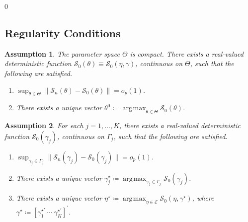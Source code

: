\documentclass[12pt]{article}
\newcommand{\blind}{0}
\newtheorem{assumption}{Assumption}
\theoremstyle{definition}
\theoremstyle{remark}
\DeclareMathOperator*{\argmax}{\arg\!\max}
\begin{document}
\blind
{
\newpage
} \fi

\setcounter{equation}{0}
\renewcommand{\theequation}{\thesection.\arabic{equation}}


\subsection{Regularity Conditions\label{subsec:regularity}}

\begin{assumption}
\label{ast:exp}
The parameter space $\Theta$ is compact. There exists a real-valued deterministic function $\mathcal{S}_0(\theta) \equiv \mathcal{S}_{0}(\eta, \gamma)$, continuous on $\Theta$, such that the following are satisfied.

\begin{enumerate}
\item $\sup_{\theta\in\Theta} \| \mathcal{S}_{n}(\theta) - \mathcal{S}_0(\theta) \| = o_p(1)$.
\item There exists a unique vector $\theta^0 \coloneqq \argmax_{\theta \in \Theta} \mathcal{S}_0(\theta)$.
\end{enumerate}
\end{assumption}

\begin{assumption}
\label{ast:exp2}
For each $j=1, \ldots, K$, there exists a real-valued deterministic function $\mathcal{S}_0(\gamma_j)$, continuous on $\Gamma_j$,
such that the following are satisfied.

\begin{enumerate}
\item $\sup_{\gamma_j\in\Gamma_j} \| \mathcal{S}_{n}(\gamma_j) - \mathcal{S}_0(\gamma_j) \| = o_p(1)$.
\item There exists a unique vector $\gamma^{\star}_j \coloneqq \argmax_{\gamma_j \in \Gamma_j} \mathcal{S}_0(\gamma_j)$.
\item There exists a unique vector $\eta^{\star} \coloneqq \argmax_{\eta \in \mathcal{E}} \mathcal{S}_0(\eta, \gamma^{\star})$, where $\gamma^{\star} \coloneqq [ \gamma^{\star \prime}_{1}\ \cdots\ \gamma^{\star \prime}_{K} ]^{\prime}$.
\end{enumerate}
\end{assumption}
\end{document}
